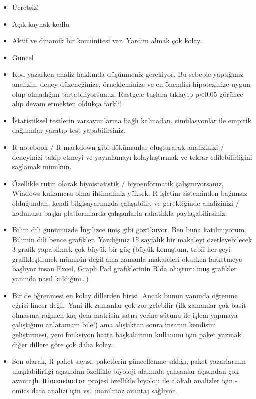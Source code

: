 \documentclass[
]{book}
\providecommand{\tightlist}{%
  \setlength{\itemsep}{0pt}\setlength{\parskip}{0pt}}
\begin{document}
\begin{itemize}
\tightlist
\item
  Ücretsiz!
\item
  Açık kaynak kodlu
\item
  Aktif ve dinamik bir komünitesi var. Yardım almak çok kolay.
\item
  Güncel
\item
  Kod yazarken analiz hakkında düşünmeniz gerekiyor. Bu sebeple yaptığınız analizin, deney düzeneğinize, örnekleminize ve en önemlisi hipotezinize uygun olup olmadığını tartabiliyorsunuz. Rastgele tuşlara tıklayıp p\textless0.05 görünce alıp devam etmekten oldukça farklı!
\item
  İstatistiksel testlerin varsayımlarına bağlı kalmadan, simülasyonlar ile empirik dağılımlar yaratıp test yapabilirsiniz.
\item
  R notebook / R markdown gibi dökümanlar oluşturarak analizinizi / deneyinizi takip etmeyi ve yayınlamayı kolaylaştırmak ve tekrar edilebilirliğini sağlamak mümkün.
\item
  Özellikle rutin olarak biyoistatistik / biyoenformatik çalışmıyorsanız, Windows kullanıcısı olma ihtimaliniz yüksek. R işletim sisteminden bağımsız olduğundan, kendi bilgisayarınızda çalışabilir, ve gerektiğinde analizinizi / kodunuzu başka platformlarda çalışanlarla rahatlıkla paylaşabilirsiniz.
\item
  Bilim dili günümüzde İngilizce imiş gibi gözüküyor. Ben buna katılmıyorum. Bilimin dili bence grafikler. Yazdığınız 15 sayfalık bir makaleyi özetleyebilecek 3 grafik yapabilmek çok büyük bir güç (büyük konuştum, tabii her şeyi grafikleştirmek mümkün değil ama zamanla makaleleri okurken farketmeye başlıyor insan Excel, Graph Pad grafiklerinin R'da oluşturulmuş grafikler yanında nasıl kaldığını\ldots)
\item
  Bir de öğrenmesi en kolay dillerden birisi. Ancak bunun yanında öğrenme eğrisi lineer değil. Yani ilk zamanlar çok zor gelebilir (ilk zamanlar çok basit olmasına rağmen kaç defa matrisin satırı yerine sütunu ile işlem yapmaya çalıştığımı anlatamam bile!) ama alıştıktan sonra insanın kendisini geliştirmesi, yeni fonksiyon hatta başkalarının kullanımı için paket yazmak diğer dillere göre çok daha kolay.
\item
  Son olarak, R paket sayısı, paketlerin güncellenme sıklığı, paket yazarlarının ulaşılabilirliği açısından özellikle biyoloji alanında çalışanlar açısından çok avantajlı. \texttt{Bioconductor} projesi özellikle biyoloji ile alakalı analizler için -omics data analizi için vs.~inanılmaz avantaj sağlıyor.
\end{itemize}
\end{document}
